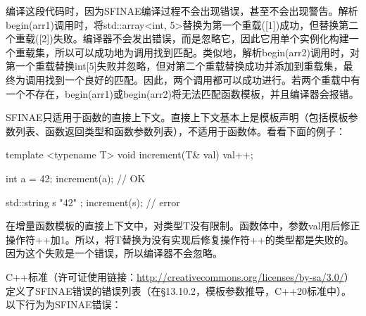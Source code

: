 编译这段代码时，因为SFINAE编译过程不会出现错误，甚至不会出现警告。解析begin(arr1)调用时，将std::array<int, 5>替换为第一个重载([1])成功，但替换第二个重载([2])失败。编译器不会发出错误，而是忽略它，因此它用单个实例化构建一个重载集，所以可以成功地为调用找到匹配。类似地，解析begin(arr2)调用时，对第一个重载替换int[5]失败并忽略，但对第二个重载替换成功并添加到重载集，最终为调用找到一个良好的匹配。因此，两个调用都可以成功进行。若两个重载中有一个不存在，begin(arr1)或begin(arr2)将无法匹配函数模板，并且编译器会报错。

SFINAE只适用于函数的直接上下文。直接上下文基本上是模板声明（包括模板参数列表、函数返回类型和函数参数列表），不适用于函数体。看看下面的例子：

\begin{cpp}
template <typename T>
void increment(T& val) { val++; }

int a = 42;
increment(a); // OK

std::string s{ "42" };
increment(s); // error
\end{cpp}

在增量函数模板的直接上下文中，对类型T没有限制。函数体中，参数val用后修正操作符++加1。所以，将T替换为没有实现后修复操作符++的类型都是失败的。因为这个失败是一个错误，所以编译器不会忽略。

C++标准（许可证使用链接：\url{http://creativecommons.org/licenses/by-sa/3.0/}）定义了SFINAE错误的错误列表（在§13.10.2，模板参数推导，C++20标准中）。以下行为为SFINAE错误：


